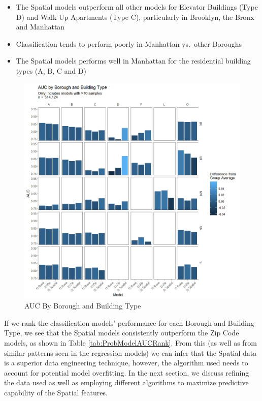 \documentclass[12pt,]{article}
\providecommand{\tightlist}{%
  \setlength{\itemsep}{0pt}\setlength{\parskip}{0pt}}
\begin{document}
\begin{itemize}
\tightlist
\item
  The Spatial models outperform all other models for Elevator Buildings
  (Type D) and Walk Up Apartments (Type C), particularly in Brooklyn,
  the Bronx and Manhattan
\item
  Classification tends to perform poorly in Manhattan vs.~other Boroughs
\item
  The Spatial models performs well in Manhattan for the residential
  building types (A, B, C and D)
\end{itemize}

\begin{figure}[H]
\includegraphics[width=1\linewidth]{Sections/tables and figures/AUC by boro and build type} \caption{AUC By Borough and Building Type}\label{fig:AUC by boro and build type}
\end{figure}

If we rank the classification models' performance for each Borough and
Building Type, we see that the Spatial models consistently outperform
the Zip Code models, as shown in Table \ref{tab:ProbModelAUCRank}. From
this (as well as from similar patterns seen in the regression models) we
can infer that the Spatial data is a superior data engineering
technique, however, the algorithm used needs to account for potential
model overfitting. In the next section, we discuss refining the data
used as well as employing different algorithms to maximize predictive
capability of the Spatial features.
\end{document}
